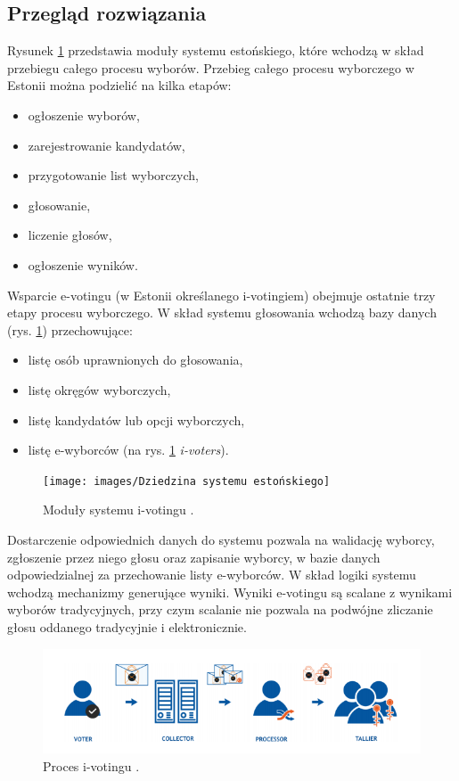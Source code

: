 \documentclass[a4paper,12pt]{book}
\begin{document}
\subsection{Przegląd rozwiązania}
Rysunek \ref{estmodules} przedstawia moduły systemu estońskiego, które wchodzą w skład przebiegu całego procesu wyborów. Przebieg całego procesu wyborczego w Estonii można podzielić na kilka etapów:
\begin{itemize}
\item ogłoszenie wyborów,
\item zarejestrowanie kandydatów,
\item przygotowanie list wyborczych,
\item głosowanie,
\item liczenie głosów,
\item ogłoszenie wyników.
\end{itemize}

Wsparcie e-votingu (w Estonii określanego i-votingiem) obejmuje ostatnie trzy etapy procesu wyborczego.
\newline
\newline
W skład systemu głosowania wchodzą bazy danych (rys. \ref{estmodules}) przechowujące:
\begin{itemize}
\item listę osób uprawnionych do głosowania,
\item listę okręgów wyborczych,
\item listę kandydatów lub opcji wyborczych,
\item listę e-wyborców (na rys. \ref{estmodules} \textit{i-voters}).
\end{itemize}

\begin{figure}[h]
	\centering
	\texttt{[image: images/Dziedzina systemu estońskiego]}
	\caption{Moduły systemu i-votingu \cite{estonian:voting}.}\label{estmodules}
\end {figure}

Dostarczenie odpowiednich danych do systemu pozwala na walidację wyborcy, zgłoszenie przez
niego głosu oraz zapisanie wyborcy, w bazie danych odpowiedzialnej za przechowanie listy e-wyborców. W skład logiki systemu wchodzą mechanizmy generujące wyniki. Wyniki e-votingu są scalane z wynikami wyborów tradycyjnych, przy czym scalanie nie pozwala na podwójne zliczanie głosu oddanego tradycyjnie i elektronicznie.

\begin{figure}[H]
	\centering
	\includegraphics[width=\textwidth]{images/Główne częsci systemu estońskiego.png}
	\caption{Proces i-votingu \cite{estonian:voting}.}\label{estprocess}
\end {figure}
\end{document}
